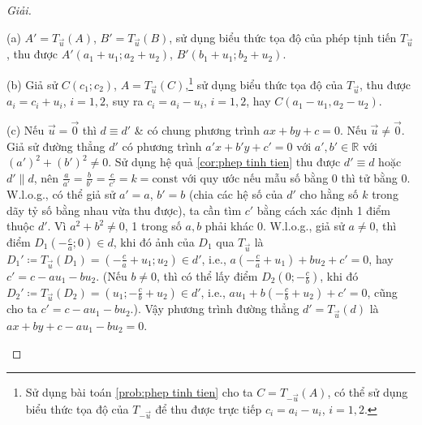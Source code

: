 \documentclass[oneside]{book}
\numberwithin{equation}{section}
\begin{document}
\begin{proof}[Giải]
	\begin{enumerate*}
		\item[(a)] $A' = T_{\vec{u}}(A)$, $B' = T_{\vec{u}}(B)$, sử dụng biểu thức tọa độ của phép tịnh tiến $T_{\vec{u}}$, thu được $A'(a_1 + u_1;a_2 + u_2)$, $B'(b_1 + u_1;b_2 + u_2)$.
		\item[(b)] Giả sử $C(c_1;c_2)$, $A = T_{\vec{u}}(C)$,\footnote{Sử dụng bài toán \ref{prob:phep tinh tien} cho ta $C = T_{-\vec{u}}(A)$, có thể sử dụng biểu thức tọa độ của $T_{-\vec{u}}$ để thu được trực tiếp $c_i = a_i - u_i$, $i = 1,2$.} sử dụng biểu thức tọa độ của $T_{\vec{u}}$, thu được $a_i = c_i + u_i$, $i = 1,2$, suy ra $c_i = a_i - u_i$, $i = 1,2$, hay $C(a_1 - u_1,a_2 - u_2)$.
		\item[(c)] Nếu $\vec{u} = \vec{0}$ thì $d\equiv d'$ \& có chung phương trình $ax + by + c = 0$. Nếu $\vec{u}\ne\vec{0}$. Giả sử đường thẳng $d'$ có phương trình $a'x + b'y + c' = 0$ với $a',b'\in\mathbb{R}$ với $(a')^2 + (b')^2\ne 0$. Sử dụng hệ quả \ref{cor:phep tinh tien} thu được $d'\equiv d$ hoặc $d'\parallel d$, nên $\frac{a}{a'} = \frac{b}{b'} = \frac{c}{c'} = k = \mbox{const}$ với quy ước nếu mẫu số bằng $0$ thì tử bằng $0$. W.l.o.g., có thể giả sử $a' = a$, $b' = b$ (chia các hệ số của $d'$ cho hằng số $k$ trong dãy tỷ số bằng nhau vừa thu được), ta cần tìm $c'$ bằng cách xác định 1 điểm thuộc $d'$. Vì $a^2 + b^2\ne 0$, 1 trong số $a,b$ phải khác $0$. W.l.o.g., giả sử $a\ne 0$, thì điểm $D_1\left(-\frac{c}{a};0\right)\in d$, khi đó ảnh của $D_1$ qua $T_{\vec{u}}$ là $D_1'\coloneqq T_{\vec{u}}(D_1) = \left(-\frac{c}{a} + u_1;u_2\right)\in d'$, i.e., $a\left(-\frac{c}{a} + u_1\right) + bu_2 + c' = 0$, hay $c' = c - au_1 - bu_2$. (Nếu $b\ne 0$, thì có thể lấy điểm $D_2\left(0;-\frac{c}{b}\right)$, khi đó $D_2'\coloneqq T_{\vec{u}}(D_2) = \left(u_1;-\frac{c}{b} + u_2\right)\in d'$, i.e., $au_1 + b\left(-\frac{c}{b} + u_2\right) + c' = 0$, cũng cho ta $c' = c - au_1 - bu_2$.). Vậy phương trình đường thẳng $d' = T_{\vec{u}}(d)$ là $ax + by + c - au_1 - bu_2 = 0$.
	\end{enumerate*}
\end{proof}
\end{document}
